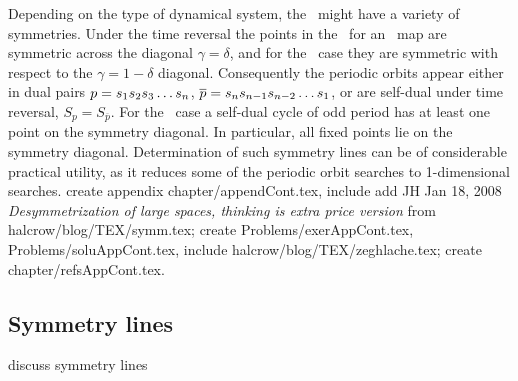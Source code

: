 Depending on the type of dynamical system, the \topp\ might have
a variety of symmetries.
Under the time reversal
\beq
\to
the points in the  \topp\ for an \opres\ map are
symmetric across the diagonal $\gamma=\delta$, and
for the \orev\ case they are symmetric
with respect to the $\gamma=1-\delta$ diagonal.
Consequently the  periodic orbits appear either in dual pairs
$p={s_{1}} {s_{2}} {s_{3}} \ldots {\ensuremath{s_{n}}}$,
$\overline{p}={s_{n}} {s_{n-1}} {s_{n-2}} \ldots {\ensuremath{s_{1}}}$,
or are self-dual under time reversal,
$S_{p} = S_{\overline{p}}$.
For the \opres\ case
a self-dual cycle of odd period has at least one point on the
symmetry diagonal. In particular, all fixed points lie on the symmetry
diagonal. Determination of such symmetry lines can be of considerable
practical utility, as it reduces some of the periodic orbit
searches to 1-dimensional searches.
	 {
create appendix
	chapter/appendCont.tex,
include
add JH Jan 18, 2008
{\em Desymmetrization of large spaces,
     thinking is extra price version}
from
	halcrow/blog/TEX/symm.tex;
create
	Problems/exerAppCont.tex,
	Problems/soluAppCont.tex,
include
	halcrow/blog/TEX/zeghlache.tex;
create
	 chapter/refsAppCont.tex.
	}

\subsection{Symmetry lines}
\label{sect:SymmLines}
discuss symmetry lines

\hfill {}

\hfill {}


\printbibliography[heading=subbibintoc,title={References}]

\newpage %
  
  
  
  
  
  

  
  

\ChapterEnd %
